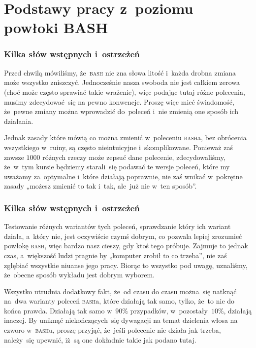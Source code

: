\documentclass[10pt,t]{beamer}
\begin{document}
\section{Podstawy pracy z~poziomu powłoki BASH}



\begin{frame}
  \frametitle{Kilka słów wstępnych i~ostrzeżeń}


  Przed chwilą mówiliśmy, że~\textsc{bash} nie zna słowa litość i~każda
  drobna zmiana może wszystko zniszczyć. Jednocześnie nasza swoboda nie jest
  całkiem zerowa (choć może często sprawiać takie wrażenie), więc
  podając tutaj różne polecenia, musimy zdecydować~się na pewno konwencje.
  Proszę więc mieć świadomość, że~\alert{pewne} zmiany można wprowadzić
  do~poleceń i~nie zmienią one sposób ich działania.

  Jednak zasady które mówią co \alert{można} zmienić w~poleceniu
  \textsc{bash}a, bez obrócenia wszystkiego w~ruiny, są często nieintuicyjne
  i~skomplikowane. Ponieważ zaś zawsze $1000$ różnych rzeczy może zepsuć
  dane polecenie, zdecydowaliśmy, że~w~tym kursie będziemy starali~się
  podawać te wersje poleceń, które my uważamy za~optymalne i~które działają
  poprawnie, nie zaś wnikać w~pokrętne zasady „możesz zmienić to tak i~tak,
  ale~już nie w~ten sposób”.

\end{frame}





\begin{frame}
  \frametitle{Kilka słów wstępnych i~ostrzeżeń}


  Testowanie różnych wariantów tych poleceń, sprawdzanie który ich wariant
  działa, a~który nie, jest oczywiście czymś dobrym, co pozwala lepiej
  zrozumieć powłokę \textsc{bash}, więc bardzo nasz cieszy, gdy ktoś tego
  próbuje. Zajmuje to jednak czas, a~większość ludzi pragnie by „komputer
  zrobił to co trzeba”, nie zaś zgłębiać wszystkie niuanse jego pracy.
  Biorąc to wszystko pod uwagę, uznaliśmy, że~obecne sposób wykładu jest
  dobrym wyborem.

  Wszystko utrudnia dodatkowy fakt, że~od czasu do czasu można~się natknąć
  na~dwa warianty poleceń \textsc{bash}a, które działają tak samo, tylko,
  że~to nie do końca prawda. Działają tak samo w~$90\%$ przypadków,
  w~pozostały~$10\%$, działają inaczej. By uniknąć niekończących~się
  dywagacji na temat dzielenia włosa na czworo w~\textsc{bash}u, proszę
  przyjąć, że~jeśli polecenie nie działa jak trzeba, należy~się upewnić,
  iż~są one \alert{dokładnie} takie jak podano tutaj.

\end{frame}
\end{document}
